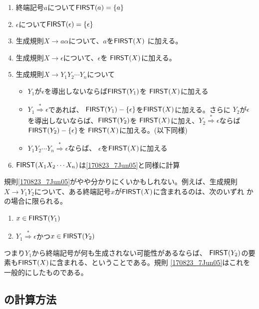 \begin{enumerate}
 \item 終端記号$a$について${\sf FIRST}(a) = \{a\}$
 \item $\epsilon$について${\sf FIRST}(\epsilon) = \{\epsilon\}$ 
 \item 生成規則$X \rightarrow a\alpha$について、$a$を${\sf FIRST}(X)$
       に加える。
 \item 生成規則$X \rightarrow \epsilon$について、$\epsilon$を
       ${\sf FIRST}(X)$に加える。
 \item 生成規則$X \rightarrow Y_1Y_2\cdots Y_n$について
       \begin{itemize}
	\item $Y_1$が$\epsilon$を導出しないならば${\sf FIRST}(Y_1)$を
	      ${\sf FIRST}(X)$に加える
	\item $Y_1 \stackrel{*}{\Rightarrow} \epsilon$であれば、
	      ${\sf FIRST}(Y_1) - \{\epsilon\}$を${\sf FIRST}(X)$に加える。さらに
	      $Y_2$が$\epsilon$を導出しないならば、${\sf FIRST}(Y_2)$を
	      ${\sf FIRST}(X)$に加え、$Y_2 \stackrel{*}{\Rightarrow}
	      \epsilon$ならば${\sf FIRST}(Y_2) - \{\epsilon\}$を
	      ${\sf FIRST}(X)$に加える。(以下同様)
	\item $Y_1Y_2\cdots Y_n \stackrel{*}{\Rightarrow} \epsilon$ならば、
	      $\epsilon$を${\sf FIRST}(X)$に加える
	      \label{170823_7Jun05}
       \end{itemize}
 \item ${\sf FIRST}(X_1X_2\cdots X_n)$は\ref{170823_7Jun05}と同様に計算
\end{enumerate}

規則\ref{170823_7Jun05}がやや分かりにくいかもしれない。例えば、生成規則$X \rightarrow
Y_1Y_2$について、ある終端記号$x$が${\sf FIRST}(X)$に含まれるのは、次のいずれ
かの場合に限られる。
\begin{enumerate}
 \item $x \in {\sf FIRST}(Y_1)$
 \item $Y_1 \stackrel{*}{\Rightarrow} \epsilon$かつ$x \in {\sf FIRST}(Y_2)$
\end{enumerate}
つまり$Y_1$から終端記号が何も生成されない可能性があるならば、
${\sf FIRST}(Y_2)$の要素も${\sf FIRST}(X)$に含まれる、ということである。規則
\ref{170823_7Jun05}はこれを一般的にしたものである。

\subsection{\Follow の計算方法}


